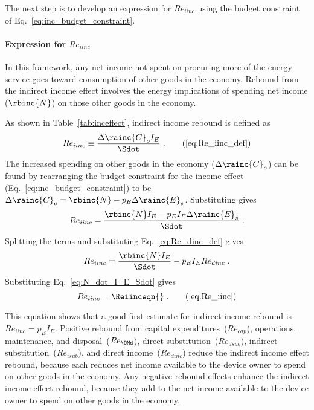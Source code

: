 The next step is to develop an expression for $Re_{iinc}$
using the budget constraint of Eq.~\ref{eq:inc_budget_constraint}.

\paragraph{Expression for $Re_{iinc}$}
\label{sec:Re_iinc}

In this framework,
any net income not spent on procuring more of the energy service
goes toward consumption of other goods in the economy.
Rebound from the indirect income effect involves 
the energy implications of spending net income ($\rbinc{N}$)
on those other goods in the economy.

As shown in Table~\ref{tab:inceffect}, indirect income rebound is defined as
%
\begin{equation}
  Re_{iinc} \equiv \frac{\Delta \rainc{C}_o I_E}{\Sdot} \; . \tag{\ref{eq:Re_iinc_def}}
\end{equation}
%
The increased spending on other goods in the economy ($\Delta \rainc{C}_o$)
can be found by rearranging the budget constraint for the income effect 
(Eq.~\ref{eq:inc_budget_constraint}) to be 
$\Delta \rainc{C}_o = \rbinc{N} - p_E \Delta \rainc{E}_s$.
Substituting gives
%
\begin{equation}
  Re_{iinc} = \frac{\rbinc{N} I_E - p_E I_E \Delta \rainc{E}_s}{\Sdot} \; .
\end{equation}
%
Splitting the terms and substituting Eq.~\ref{eq:Re_dinc_def} gives
%
\begin{equation}
  Re_{iinc} = \frac{\rbinc{N} I_E}{\Sdot} - p_E I_E Re_{dinc} \; .
\end{equation}
%
Substituting Eq.~\ref{eq:N_dot_I_E_Sdot} gives 
%
\begin{equation}
  Re_{iinc} = \Reiinceqn{} \; . \tag{\ref{eq:Re_iinc}}
\end{equation}

This equation shows that a good first estimate for indirect income rebound
is $Re_{iinc} = p_E I_E$.
Positive rebound from capital expenditures~($Re_{cap}$), 
operations, maintenance, and disposal~($Re_{\OMd}$),
direct substitution~($Re_{dsub}$), 
indirect substitution~($Re_{isub}$), and 
direct income~($Re_{dinc}$)
reduce the indirect income effect rebound, 
because each reduces net income available to the device owner to spend on other goods in the economy.
Any negative rebound effects enhance the indirect income effect rebound, because 
they add to the net income available to the device owner to spend on other goods in the economy.



